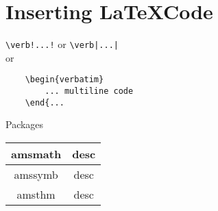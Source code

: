 \documentclass{article}
\begin{document}
\section{Inserting \LaTeX Code}
    \verb|\verb!...!| or \verb!\verb|...|! \\or

\begin{verbatim}
    \begin{verbatim}
        ... multiline code
    \end{...
\end{verbatim}

\newpage
\Large Packages
\normalsize

\begin{center}
    \begin{tabular}{c|c}
    \hline
        amsmath & desc \\
        \hline
        amssymb & desc \\
        \hline
        amsthm & desc \\

    \end{tabular}
\end{center}
\end{document}
